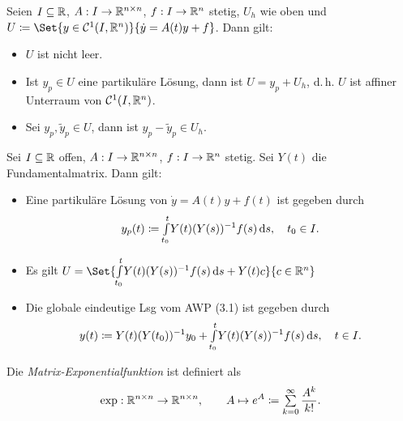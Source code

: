 \documentclass{cheat-sheet}
\begin{document}
\begin{satz}%
  Seien $I \subseteq \mathbb{R}$, $A : I \to \mathbb{R}^{n \times n}$, $f : I \to \mathbb{R}^n$ stetig, $U_h$ wie oben und $U \coloneqq \Set{ y \in \mathcal{C}^1(I, \R^n) }{ \dot{y} = A(t) y + f }$. Dann gilt:
  \begin{itemize}
    \item $U$ ist nicht leer.
    \item Ist $y_p \in U$ eine partikuläre Lösung, dann ist $U = y_p + U_h$, d.\,h. $U$ ist affiner Unterraum von $\mathcal{C}^1(I, \mathbb{R}^n)$.
    \item Sei $y_p, \tilde{y}_p \in U$, dann ist $y_p - \tilde{y}_p \in U_h$.
  \end{itemize}
\end{satz}

\begin{satz}
  Sei $I \subseteq \mathbb{R}$ offen, $A : I \to \mathbb{R}^{n \times n}$, $f : I \to \mathbb{R}^n$ stetig. Sei $Y(t)$ die Fundamentalmatrix. Dann gilt:
  \begin{itemize}
    \item Eine partikuläre Lösung von $\dot{y} = A(t) y + f(t)$ ist gegeben durch
    \[ y_p(t) \coloneqq {\textstyle \int\limits_{t_0}^{t}} Y(t) (Y(s))^{-1} f(s) \,\mathrm{d} s, \quad t_0 \in I. \]
    \item Es gilt $U = \Set{ \Int{t_0}{t}{Y(t) (Y(s))^{-1} f(s)}{s} + Y(t) c }{ c \in \R^n }$
    \item Die globale eindeutige Lsg vom AWP (3.1) ist gegeben durch
    \[ y(t) \coloneqq Y(t) (Y(t_0))^{-1} y_0 + {\textstyle \int\limits_{t_0}^{t}} Y(t) (Y(s))^{-1} f(s) \,\mathrm{d} s, \quad t \in I. \]
  \end{itemize}
\end{satz}


\begin{defn}
  Die \emph{Matrix-Exponentialfunktion} ist definiert als
  \[ \exp : \R^{n \times n} \to \R^{n \times n}, \qquad A \mapsto e^A \coloneqq \sum_{k=0}^\infty \frac{A^k}{k!}. \]
\end{defn}
\end{document}
